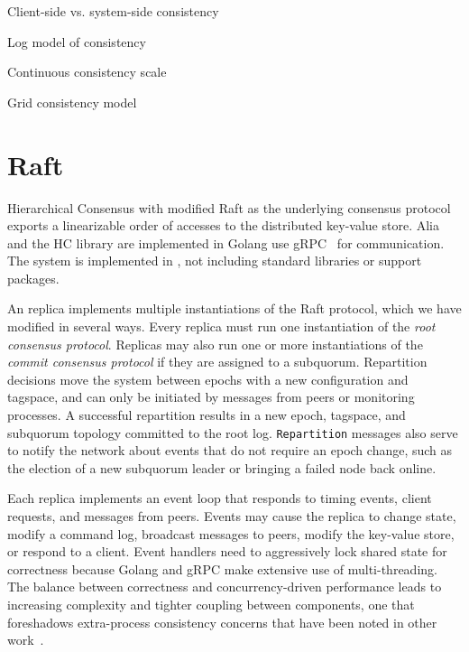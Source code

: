 Client-side vs. system-side consistency

Log model of consistency

Continuous consistency scale

Grid consistency model

\section{Raft}

Hierarchical Consensus with modified Raft as the underlying consensus
protocol exports a linearizable order of accesses to the distributed key-value
store.
Alia and the HC library are implemented in Golang use gRPC~\cite{grpc} for
communication.
The system is implemented in , not including standard
libraries or support packages.

An  replica implements multiple instantiations of the Raft protocol, which we have modified in several ways.
Every replica must run one instantiation of the \textit{root consensus protocol}.
Replicas may also run one or more instantiations of the \textit{commit consensus protocol} if they are assigned to a subquorum.
Repartition decisions move the system between epochs with a new configuration and tagspace, and can only be initiated by messages from peers or monitoring processes.
A successful repartition results in a new epoch, tagspace, and subquorum topology committed to the root log.
\texttt{Repartition} messages also serve to notify the network about events that do not require an epoch change, such as the election of a new subquorum leader or bringing a failed node back online.

Each replica implements an event loop that responds to timing events,
client requests, and messages from peers.
Events may cause the replica to change state, modify a command log, broadcast
messages to peers, modify the key-value store, or respond to a client.
Event
handlers need to aggressively lock shared state for correctness because Golang and
gRPC make extensive use of multi-threading.
The balance between correctness and concurrency-driven performance leads to
increasing complexity and tighter coupling between components, one that
foreshadows extra-process consistency concerns that have been noted in other
work~\cite{paxos_live,raft,raft_students_guide}.

